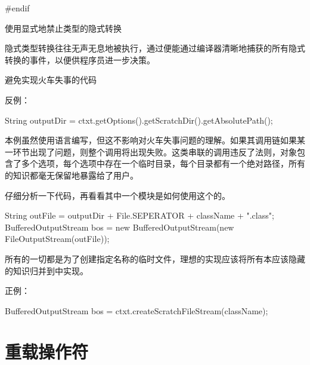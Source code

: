 \begin{content}
\begin{leftbar}
\begin{c++}[caption={io/ObjectOutputStream.h}]
#endif
\end{c++}
\end{leftbar}

\begin{regulation}
使用显式地禁止类型的隐式转换
\end{regulation}

隐式类型转换往往无声无息地被执行，通过便能通过编译器清晰地捕获的所有隐式转换的事件，以便供程序员进一步决策。

\begin{regulation}
避免实现火车失事的代码
\end{regulation}

反例：
\begin{leftbar}
\begin{java}
String outputDir = ctxt.getOptions().getScratchDir().getAbsolutePath();
\end{java}
\end{leftbar}

本例虽然使用语言编写，但这不影响对火车失事问题的理解。如果其调用链如果某一环节出现了问题，则整个调用将出现失败。这类串联的调用违反了法则，对象包含了多个选项，每个选项中存在一个临时目录，每个目录都有一个绝对路径，所有的知识都毫无保留地暴露给了用户。

仔细分析一下代码，再看看其中一个模块是如何使用这个的。

\begin{leftbar}
\begin{java}
String outFile = outputDir + File.SEPERATOR + className + ".class";
BufferedOutputStream bos = new BufferedOutputStream(new FileOutputStream(outFile));
\end{java}
\end{leftbar}

所有的一切都是为了创建指定名称的临时文件，理想的实现应该将所有本应该隐藏的知识归并到中实现。

正例：
\begin{leftbar}
\begin{c++}
BufferedOutputStream bos = ctxt.createScratchFileStream(className);
\end{c++}
\end{leftbar}

\end{content}

\section{重载操作符}

